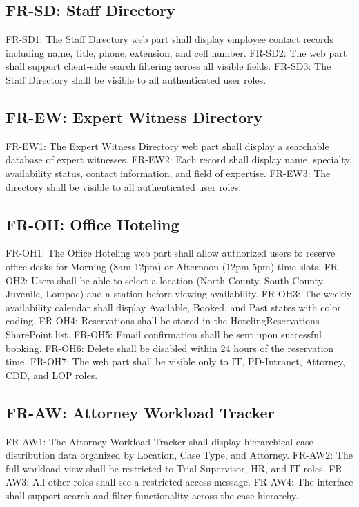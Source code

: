\documentclass[12pt]{article}
\begin{document}
\subsection*{FR-SD: Staff Directory}

FR-SD1: The Staff Directory web part shall display employee contact records including name, title, phone, extension, and cell number. FR-SD2: The web part shall support client-side search filtering across all visible fields. FR-SD3: The Staff Directory shall be visible to all authenticated user roles.

\subsection*{FR-EW: Expert Witness Directory}

FR-EW1: The Expert Witness Directory web part shall display a searchable database of expert witnesses. FR-EW2: Each record shall display name, specialty, availability status, contact information, and field of expertise. FR-EW3: The directory shall be visible to all authenticated user roles.

\subsection*{FR-OH: Office Hoteling}

FR-OH1: The Office Hoteling web part shall allow authorized users to reserve office desks for Morning (8am-12pm) or Afternoon (12pm-5pm) time slots. FR-OH2: Users shall be able to select a location (North County, South County, Juvenile, Lompoc) and a station before viewing availability. FR-OH3: The weekly availability calendar shall display Available, Booked, and Past states with color coding. FR-OH4: Reservations shall be stored in the HotelingReservations SharePoint list. FR-OH5: Email confirmation shall be sent upon successful booking. FR-OH6: Delete shall be disabled within 24 hours of the reservation time. FR-OH7: The web part shall be visible only to IT, PD-Intranet, Attorney, CDD, and LOP roles.

\subsection*{FR-AW: Attorney Workload Tracker}

FR-AW1: The Attorney Workload Tracker shall display hierarchical case distribution data organized by Location, Case Type, and Attorney. FR-AW2: The full workload view shall be restricted to Trial Supervisor, HR, and IT roles. FR-AW3: All other roles shall see a restricted access message. FR-AW4: The interface shall support search and filter functionality across the case hierarchy.
\end{document}
